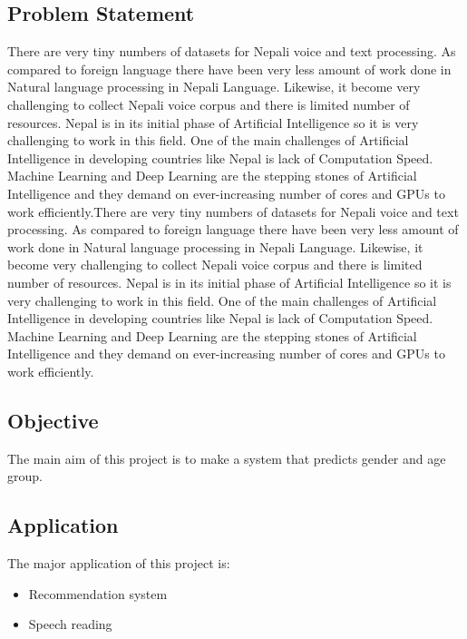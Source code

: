 \documentclass[a4paper,12pt]{article}
\begin{document}
\subsection{Problem Statement}
{There are very tiny numbers of datasets for Nepali voice and text processing. As compared to
foreign language there have been very less amount of work done in Natural language
processing in Nepali Language. Likewise, it become very challenging to collect Nepali voice
corpus and there is limited number of resources. Nepal is in its initial phase of Artificial
Intelligence so it is very challenging to work in this field. One of the main challenges of
Artificial Intelligence in developing countries like Nepal is lack of Computation Speed.
Machine Learning and Deep Learning are the stepping stones of Artificial Intelligence and they
demand on ever-increasing number of cores and GPUs to work efficiently.There are very tiny numbers of datasets for Nepali voice and text processing. As compared to
foreign language there have been very less amount of work done in Natural language
processing in Nepali Language. Likewise, it become very challenging to collect Nepali voice
corpus and there is limited number of resources. Nepal is in its initial phase of Artificial
Intelligence so it is very challenging to work in this field. One of the main challenges of
Artificial Intelligence in developing countries like Nepal is lack of Computation Speed.
Machine Learning and Deep Learning are the stepping stones of Artificial Intelligence and they
demand on ever-increasing number of cores and GPUs to work efficiently.}

\subsection{Objective}
{The main aim of this project is to make a system that predicts gender and age group.}

\subsection{Application}
{The major application of this project is:
\begin{itemize}
    \item Recommendation system
    \item Speech reading
\end{itemize}
}
\pagebreak
\end{document}
